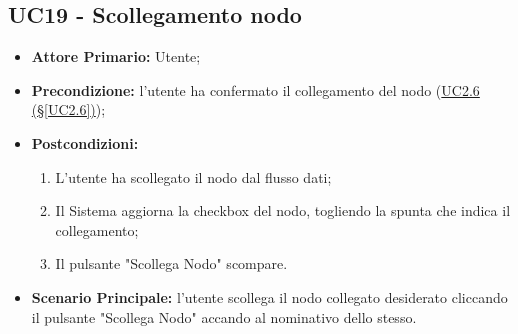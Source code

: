 \pagebreak

\subsection{UC19 - Scollegamento nodo}\label{UC19}
\begin{itemize}
	\item \textbf{Attore Primario:} Utente;
	\item \textbf{Precondizione:} l'utente ha confermato il collegamento del nodo (\hyperref[UC2.6]{UC2.6 									(§\ref*{UC2.6})});
	\item \textbf{Postcondizioni:}
	\begin{enumerate}
		\item L'utente ha scollegato il nodo dal flusso dati;
		\item Il Sistema aggiorna la checkbox del nodo, togliendo la spunta che indica il collegamento;
		\item Il pulsante "Scollega Nodo" scompare. 
	\end{enumerate}
	\item \textbf{Scenario Principale:} l'utente scollega il nodo collegato desiderato cliccando il pulsante "Scollega Nodo" accando al nominativo dello stesso.
\end{itemize}

\pagebreak

